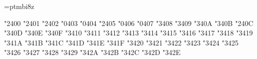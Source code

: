 \def\setmathsizes[#1/#2/#3]{%
   \def\sizemtext{#1\ptmunit}\def\sizemscript{#2\ptmunit}%
   \def\sizemsscript{#3\ptmunit}%
}
\newdimen\ptmunit \ptmunit=1pt
\setmathsizes[10/7/5]

\ifx\tenbi\undefined \font\tenbi=ptmbi8z \relax \fi
\normalmath   %
\itvariables  %


\def\amsafam{4} \def\amsbfam{5} \def\txsycfam{6} 
\def\txexafam{7} \def\txmiafam{8}


\mathchardef \boxdot   "2\amsafam 00
\mathchardef \boxplus   "2\amsafam 01
\mathchardef \boxtimes   "2\amsafam 02
\mathchardef \square   "0\amsafam 03
\mathchardef \blacksquare   "0\amsafam 04
\mathchardef \centerdot   "2\amsafam 05
\mathchardef \lozenge   "0\amsafam 06
\mathchardef \blacklozenge   "0\amsafam 07
\mathchardef \circlearrowright   "3\amsafam 08
\mathchardef \circlearrowleft   "3\amsafam 09
\mathchardef \rightleftharpoons   "3\amsafam 0A
\mathchardef \leftrightharpoons   "3\amsafam 0B
\mathchardef \boxminus   "2\amsafam 0C
\mathchardef \Vdash   "3\amsafam 0D
\mathchardef \Vvdash   "3\amsafam 0E
\mathchardef \vDash   "3\amsafam 0F
\mathchardef \twoheadrightarrow   "3\amsafam 10
\mathchardef \twoheadleftarrow   "3\amsafam 11
\mathchardef \leftleftarrows   "3\amsafam 12
\mathchardef \rightrightarrows   "3\amsafam 13
\mathchardef \upuparrows   "3\amsafam 14
\mathchardef \downdownarrows   "3\amsafam 15
\mathchardef \upharpoonright   "3\amsafam 16
\mathchardef \downharpoonright   "3\amsafam 17
\mathchardef \upharpoonleft   "3\amsafam 18
\mathchardef \downharpoonleft   "3\amsafam 19
\mathchardef \rightarrowtail   "3\amsafam 1A
\mathchardef \leftarrowtail   "3\amsafam 1B
\mathchardef \leftrightarrows   "3\amsafam 1C
\mathchardef \rightleftarrows   "3\amsafam 1D
\mathchardef \Lsh   "3\amsafam 1E
\mathchardef \Rsh   "3\amsafam 1F
\mathchardef \rightsquigarrow   "3\amsafam 20
\mathchardef \leftrightsquigarrow   "3\amsafam 21
\mathchardef \looparrowleft   "3\amsafam 22
\mathchardef \looparrowright   "3\amsafam 23
\mathchardef \circeq   "3\amsafam 24
\mathchardef \succsim   "3\amsafam 25
\mathchardef \gtrsim   "3\amsafam 26
\mathchardef \gtrapprox   "3\amsafam 27
\mathchardef \multimap   "3\amsafam 28
\mathchardef \therefore   "3\amsafam 29
\mathchardef \because   "3\amsafam 2A
\mathchardef \doteqdot   "3\amsafam 2B
\mathchardef \triangleq   "3\amsafam 2C
\mathchardef \precsim   "3\amsafam 2D
\mathchardef \lesssim   "3\amsafam 2E
